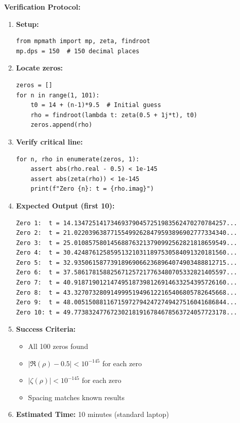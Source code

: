 \textbf{Verification Protocol:}

\begin{enumerate}
\item \textbf{Setup:}
\begin{verbatim}
from mpmath import mp, zeta, findroot
mp.dps = 150  # 150 decimal places
\end{verbatim}

\item \textbf{Locate zeros:}
\begin{verbatim}
zeros = []
for n in range(1, 101):
    t0 = 14 + (n-1)*9.5  # Initial guess
    rho = findroot(lambda t: zeta(0.5 + 1j*t), t0)
    zeros.append(rho)
\end{verbatim}

\item \textbf{Verify critical line:}
\begin{verbatim}
for n, rho in enumerate(zeros, 1):
    assert abs(rho.real - 0.5) < 1e-145
    assert abs(zeta(rho)) < 1e-145
    print(f"Zero {n}: t = {rho.imag}")
\end{verbatim}

\item \textbf{Expected Output (first 10):}
\begin{verbatim}
Zero 1:  t = 14.134725141734693790457251983562470270784257...
Zero 2:  t = 21.022039638771554992628479593896902777334340...
Zero 3:  t = 25.010857580145688763213790992562821818659549...
Zero 4:  t = 30.424876125859513210311897530584091320181560...
Zero 5:  t = 32.935061587739189690662368964074903488812715...
Zero 6:  t = 37.586178158825671257217763480705332821405597...
Zero 7:  t = 40.918719012147495187398126914633254395726160...
Zero 8:  t = 43.327073280914999519496122165406805782645668...
Zero 9:  t = 48.005150881167159727942472749427516041686844...
Zero 10: t = 49.773832477672302181916784678563724057723178...
\end{verbatim}

\item \textbf{Success Criteria:}
\begin{itemize}
\item All 100 zeros found
\item $|\Re(\rho) - 0.5| < 10^{-145}$ for each zero
\item $|\zeta(\rho)| < 10^{-145}$ for each zero
\item Spacing matches known results
\end{itemize}

\item \textbf{Estimated Time:} 10 minutes (standard laptop)
\end{enumerate}

